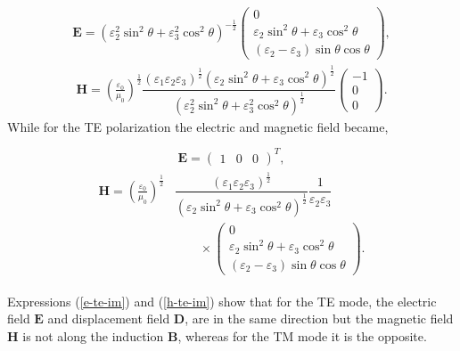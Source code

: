 \documentclass[9pt,twocolumn,twoside]{osajnl}
\begin{document}
 \begin{align}
  \mathbf{E}=\left(\varepsilon_{2}^{2} \sin^{2}{\theta} + \varepsilon_{3}^{2}\cos^{2}{\theta}\right)^{-\frac{1}{2}}
 \begin{pmatrix}
 0\\
  \varepsilon_{2} \sin^{2}\theta + \varepsilon_{3}\cos^{2}\theta\\
 (\varepsilon_{2}-\varepsilon_{3})\sin\theta\cos\theta
 \end{pmatrix},
\end{align}
\begin{align}
  \mathbf{H}=\left(\frac{\varepsilon_{0}}{\mu_{0}}\right)^{\frac{1}{2}}\dfrac{(\varepsilon_{1}\varepsilon_{2}\varepsilon_{3})^{\frac{1}{2}}({\varepsilon_{2}\sin^{2}{\theta}+\varepsilon_{3}\cos^{2}{\theta}})^{\frac{1}{2}}}{(\varepsilon_{2}^{2} \sin^{2}{\theta} + \varepsilon_{3}^{2}\cos^{2}{\theta})^{\frac{1}{2}}}
 \begin{pmatrix}
 -1\\0\\0
 \end{pmatrix}.
 \end{align}
While for the TE polarization the electric and magnetic field became,

\begin{equation}\label{e-te-im}
\mathbf{E}=
 \begin{pmatrix}
 1&0&0
 \end{pmatrix}^{T},
\end{equation}
\begin{align}\label{h-te-im}
\begin{split}
  \mathbf{H}= \left(\frac{\varepsilon_{0}}{\mu_{0}}\right)^{\frac{1}{2}}&\dfrac{(\varepsilon_{1}\varepsilon_{2}\varepsilon_{3})^{\frac{1}{2}}}{({\varepsilon_{2}\sin^{2}{\theta}+\varepsilon_{3}\cos^{2}{\theta}})^{\frac{1}{2}}}\dfrac{1}{\varepsilon_{2}\varepsilon_{3}}
  \\ & \qquad\times
  \begin{pmatrix}
  0\\
 \varepsilon_{2} \sin^{2}\theta + \varepsilon_{3}\cos^{2}\theta\\
 (\varepsilon_{2}-\varepsilon_{3})\sin\theta\cos\theta
 \end{pmatrix}.
\end{split}
\end{align}

Expressions (\ref{e-te-im}) and (\ref{h-te-im}) show that  for the TE mode, the electric field $\mathbf{E}$ and displacement field $\mathbf{D}$, are in the same direction but the magnetic field $\mathbf{H}$ is not along the induction $\mathbf{B}$, whereas for the  TM mode it is the opposite.
\end{document}
